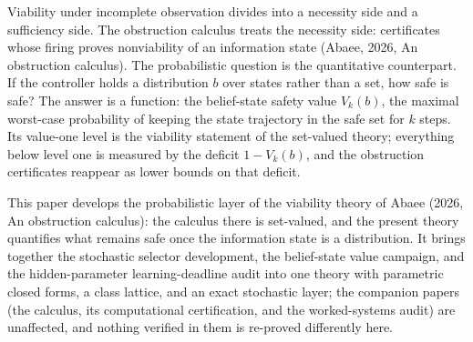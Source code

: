 \documentclass[10pt,twocolumn]{article}
\theoremstyle{plain}
\theoremstyle{definition}
\theoremstyle{remark}
\begin{document}
Viability under incomplete observation divides into a necessity side and a
sufficiency side. The obstruction calculus treats the necessity side:
certificates whose firing proves nonviability of an information state
(Abaee, 2026, An obstruction calculus). The probabilistic question is the quantitative counterpart.
If the controller holds a distribution \(b\) over states rather than a set,
how safe is safe? The answer is a function: the belief-state safety value
\(V_{k}(b)\), the maximal worst-case probability of keeping the state
trajectory in the safe set for \(k\) steps. Its value-one level is the
viability statement of the set-valued theory; everything below level one
is measured by the deficit \(1 - V_{k}(b)\), and the obstruction
certificates reappear as lower bounds on that deficit.

This paper develops the probabilistic layer of the viability theory of
Abaee (2026, An obstruction calculus): the calculus there is set-valued, and the present theory
quantifies what remains safe once the information state is a
distribution. It brings together the stochastic selector development, the
belief-state value campaign, and the hidden-parameter learning-deadline
audit into one theory with parametric closed forms, a class lattice, and
an exact stochastic layer; the companion papers (the calculus, its
computational certification, and the worked-systems audit) are unaffected,
and nothing verified in them is re-proved differently here.
\end{document}
